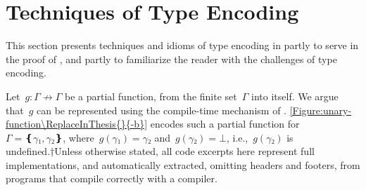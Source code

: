 \documentclass[a4paper,USenglish]{lipics-v2016}
\begin{document}
\section{Techniques of Type Encoding}
\label{section:toolkit}
This section presents techniques and idioms of type encoding in \Java 
  partly to serve in the proof of , 
  and partly to familiarize the reader with 
  the challenges of type encoding. 

Let~$g:Γ↛Γ$ be a partial function,
  from the finite set~$Γ$ into itself.
We argue that~$g$ can
  be represented using the compile-time mechanism of \Java.
  \cref{Figure:unary-function\ReplaceInThesis{}{-b}} encodes such a partial function for~$Γ=❴γ₁,γ₂❵$, where~$g(γ₁)=γ₂$
  and~$g(γ₂)=⊥$, i.e.,~$g(γ₂)$ is undefined.†{Unless otherwise stated,
      all code excerpts here represent full implementations,
      and automatically extracted, omitting headers and footers,
    from \Java programs that compile correctly with a  compiler.}
\end{document}
